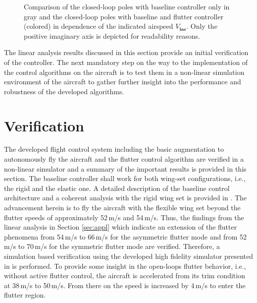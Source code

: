 \documentclass[aerospace,article,submit,moreauthors,pdftex,10pt,a4paper]{Definitions/mdpi}
\begin{document}
\begin{figure}[h]
	\centering
	
	\caption{Comparison of the closed-loop poles with baseline controller only in gray and the closed-loop poles with baseline and flutter controller (colored) in dependence of the indicated airspeed $V_{\textbf{ias}}$. Only the positive imaginary axis is depicted for readability reasons.}
	\label{fig:poles}	
\end{figure}

The  linear analysis results discussed in this section provide an initial verification of the controller. The next mandatory step on the way to the implementation of the control algorithms on the aircraft is to test them in a non-linear simulation environment of the aircraft to gather further insight into the performance and robustness of the developed algorithms.
 
\section{Verification}\label{sec:verif}
The developed flight control system including the basic augmentation to autonomously fly the aircraft and the flutter control algorithm are verified in a non-linear simulator and a summary of the important results is provided in this section. The  baseline controller  shall work for both wing-set configurations, i.e., the rigid and the elastic one. A detailed description of the baseline control architecture and a coherent analysis with the rigid wing set is provided in \cite{Ossmann19a}. The advancement herein is to fly the aircraft with the flexible wing set beyond the flutter speeds of approximately 52\,m/s and 54\,m/s. Thus, the findings from the linear analysis in Section \ref{sec:appl} which indicate an extension of the flutter phenomena from 54\,m/s to 66\,m/s for the asymmetric flutter mode and from 52\,m/s to 70\,m/s for the symmetric flutter mode 
are verified. Therefore, a simulation based verification using the developed high fidelity simulator presented in  \cite{Wuestenhagen18} is performed.  To provide some insight in the open-loops flutter behavior, i.e., without active flutter control, the aircraft is accelerated from its trim condition at 38\,m/s to 50\,m/s. From there on the speed is increased by 4\,m/s to enter the flutter region.
\end{document}
